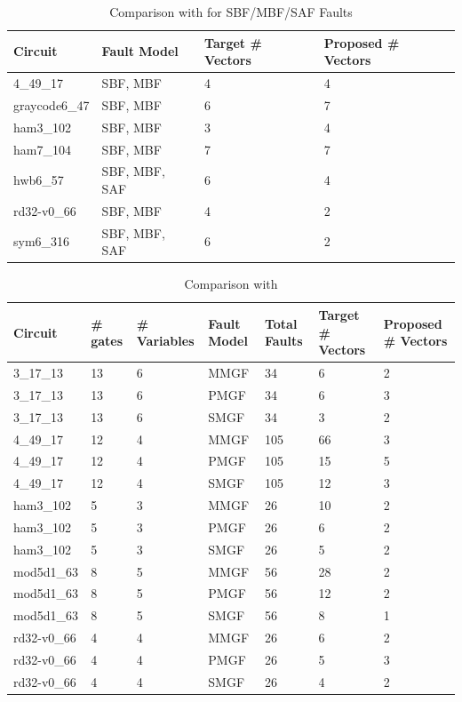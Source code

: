 \documentclass[conference]{IEEEtran}
\begin{document}
\begin{table}[t]
\centering
\scriptsize
\caption{Comparison with \cite{ref12} for SBF/MBF/SAF Faults} 
\begin{tabular}{p{1.3cm} p{1.8cm} p{1.0cm} p{1.0cm}}
\hline
\textbf{Circuit} & 
\textbf{Fault Model} & 
\textbf{Target \# Vectors} & 
\textbf{Proposed \# Vectors} \\
\hline

4\_49\_17 & SBF, MBF & 4 & 4 \\
graycode6\_47 & SBF, MBF & 6 & 7 \\
ham3\_102 & SBF, MBF & 3 & 4 \\
ham7\_104 & SBF, MBF & 7 & 7 \\
hwb6\_57 & SBF, MBF, SAF & 6 & 4 \\
rd32-v0\_66 & SBF, MBF & 4 & 2 \\
sym6\_316 & SBF, MBF, SAF & 6 & 2 \\
\hline
\end{tabular}
\end{table}


\begin{table}[t]
\centering
\scriptsize
\caption{Comparison with \cite{ref14}}
\begin{tabular}{p{1.3cm} p{0.7cm} p{0.7cm} p{0.7cm} p{0.7cm} p{0.7cm} p{0.7cm}}
\hline
\textbf{Circuit} & 
\textbf{\# gates} & 
\textbf{\# Variables} & 
\textbf{Fault Model} & 
\textbf{Total Faults} & 
\textbf{Target \# Vectors} & 
\textbf{Proposed \# Vectors} \\
\hline

3\_17\_13 & 13 & 6 & MMGF & 34 & 6 & 2 \\
3\_17\_13 & 13 & 6 & PMGF & 34 & 6 & 3 \\
3\_17\_13 & 13 & 6 & SMGF & 34 & 3 & 2 \\
4\_49\_17 & 12 & 4 & MMGF & 105 & 66 & 3 \\
4\_49\_17 & 12 & 4 & PMGF & 105 & 15 & 5 \\
4\_49\_17 & 12 & 4 & SMGF & 105 & 12 & 3 \\
ham3\_102 & 5 & 3 & MMGF & 26 & 10 & 2 \\
ham3\_102 & 5 & 3 & PMGF & 26 & 6 & 2 \\
ham3\_102 & 5 & 3 & SMGF & 26 & 5 & 2 \\
mod5d1\_63 & 8 & 5 & MMGF & 56 & 28 & 2 \\
mod5d1\_63 & 8 & 5 & PMGF & 56 & 12 & 2 \\
mod5d1\_63 & 8 & 5 & SMGF & 56 & 8 & 1 \\
rd32-v0\_66 & 4 & 4 & MMGF & 26 & 6 & 2 \\
rd32-v0\_66 & 4 & 4 & PMGF & 26 & 5 & 3 \\
rd32-v0\_66 & 4 & 4 & SMGF & 26 & 4 & 2 \\
\hline
\end{tabular}
\end{table}
\end{document}
